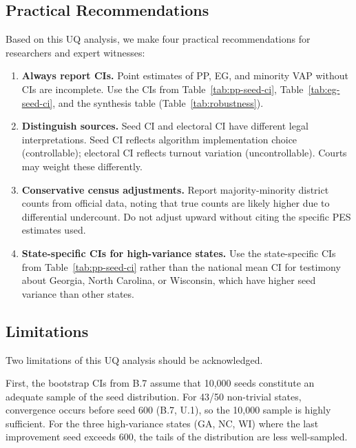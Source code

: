 \subsection{Practical Recommendations}

Based on this UQ analysis, we make four practical recommendations
for researchers and expert witnesses:

\begin{enumerate}
  \item \textbf{Always report CIs.} Point estimates of PP, EG, and
    minority VAP without CIs are incomplete. Use the CIs from
    Table~\ref{tab:pp-seed-ci}, Table~\ref{tab:eg-seed-ci}, and
    the synthesis table (Table~\ref{tab:robustness}).

  \item \textbf{Distinguish sources.} Seed CI and electoral CI have
    different legal interpretations. Seed CI reflects algorithm
    implementation choice (controllable); electoral CI reflects
    turnout variation (uncontrollable). Courts may weight these
    differently.

  \item \textbf{Conservative census adjustments.} Report majority-minority
    district counts from official data, noting that true counts are
    likely higher due to differential undercount. Do not adjust
    upward without citing the specific PES estimates used.

  \item \textbf{State-specific CIs for high-variance states.} Use the
    state-specific CIs from Table~\ref{tab:pp-seed-ci} rather than
    the national mean CI for testimony about Georgia, North Carolina,
    or Wisconsin, which have higher seed variance than other states.
\end{enumerate}

\subsection{Limitations}

Two limitations of this UQ analysis should be acknowledged.

First, the bootstrap CIs from B.7 assume that 10,000 seeds constitute
an adequate sample of the seed distribution. For 43/50 non-trivial
states, convergence occurs before seed 600 (B.7, U.1), so the 10,000
sample is highly sufficient. For the three high-variance states
(GA, NC, WI) where the last improvement seed exceeds 600, the tails
of the distribution are less well-sampled.


